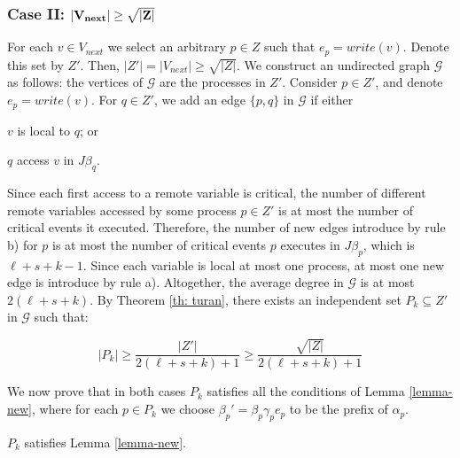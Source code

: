 \subsubsection*{\hspace{5mm} Case II: $\bf |V_{next}| \geq \sqrt{|Z|}$}

For each $v \in V_{next}$ we select an arbitrary $p \in Z$ such that $e_p = write(v)$. Denote this set by $Z'$. Then, $|Z'|=|V_{next}| \geq \sqrt{|Z|}$.
We construct an undirected graph $\mathcal{G}$ as follows: the vertices of $\mathcal{G}$ are the processes in $Z'$. Consider $p \in Z'$, and denote $e_p = write(v)$. For $q \in Z'$, we add an edge $\{p,q\}$ in $\mathcal{G}$ if either
\begin{inparaenum}
	\item $v$ is local to $q$; or
	\item $q$ access $v$ in $J \beta_q$.
\end{inparaenum}

Since each first access to a remote variable is critical, the number of different remote variables accessed by some process $p \in Z'$ is at most the number of critical events it executed. Therefore, the number of new edges introduce by rule b) for $p$ is at most the number of critical events $p$ executes in $J \beta_p$, which is $\ell+s+k-1$. Since each variable is local at most one process, at most one new edge is introduce by rule a).
Altogether, the average degree in $\mathcal{G}$ is at most $2(\ell+s+k)$. By Theorem \ref{th: turan}, there exists an independent set $P_k \subseteq Z'$ in $\mathcal{G}$ such that:

$$ |P_k| \geq \frac{|Z'|}{2(\ell+s+k)+1} \geq \frac{\sqrt{|Z|}}{2(\ell+s+k)+1}$$

We now prove that in both cases $P_k$ satisfies all the conditions of Lemma \ref{lemma-new}, where for each $p \in P_k$ we choose $\beta_p' = \beta_p \gamma_p e_p$ to be the prefix of $\alpha_p$.

\begin{claim-subsection}
	$P_k$ satisfies Lemma \ref{lemma-new}.
\end{claim-subsection}
 
